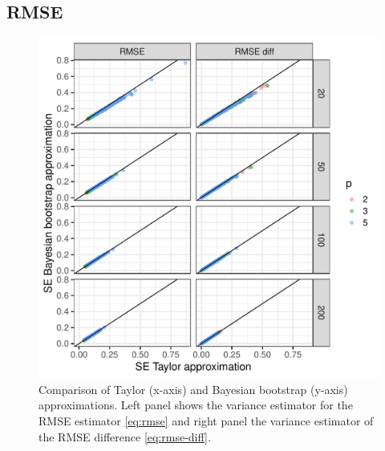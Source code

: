 \documentclass{article}
\begin{document}
\subsection{RMSE}
\begin{figure}[!htb]
    \centering
    \includegraphics[width=\textwidth]{figures/rmse.pdf}
    \caption{Comparison of Taylor (x-axis) and Bayesian bootstrap (y-axis) approximations. Left panel shows the variance estimator for the RMSE estimator \eqref{eq:rmse} and right panel the variance estimator of the RMSE difference \eqref{eq:rmse-diff}.}
    \label{fig:rmse-plot}
\end{figure}
\end{document}
